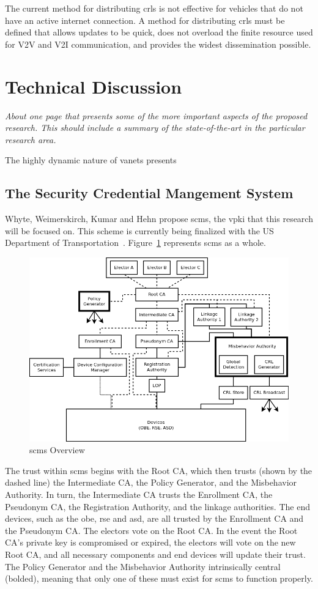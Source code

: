 \documentclass {article}
\newcommand{\sechint}[1]{\small{\emph{#1}} \bigskip}
\begin{document}
The current method for distributing \gls{crl}s is not effective for vehicles that do not have an active internet connection. A method for distributing \gls{crl}s must be defined that allows updates to be quick, does not overload the finite resource used for V2V and V2I communication, and provides the widest dissemination possible.

\section{Technical Discussion}{\sechint{About one page that presents some of the more important aspects of the proposed research. This should include a summary of the state-of-the-art in the particular research area.}}

The highly dynamic nature of \gls{vanet}s presents

\subsection{The Security Credential Mangement System}
Whyte, Weimerskirch, Kumar and Hehn propose \gls{scms}, the \gls{vpki} that this research will be focused on. This scheme is currently being finalized with the US Department of Transportation~\autocite{brecht_security_2018}. Figure~\ref{scms_overview} represents \gls{scms} as a whole. 
\begin{figure}[!ht]
	\centering
	\includegraphics[width=.8\textwidth]{images/scms_diagram.png}
	\caption{\gls{scms} Overview}
	\label{scms_overview}
\end{figure}
The trust within \gls{scms} begins with the Root CA, which then trusts (shown by the dashed line) the Intermediate CA, the Policy Generator, and the Misbehavior Authority. In turn, the Intermediate CA trusts the Enrollment CA, the Pseudonym CA, the Registration Authority, and the linkage authorities. The end devices, such as the \gls{obe}, \gls{rse} and \gls{asd}, are all trusted by the Enrollment CA and the Pseudonym CA. The electors vote on the Root CA. In the event the Root CA's private key is compromised or expired, the electors will vote on the new Root CA, and all necessary components and end devices will update their trust. The Policy Generator and the Misbehavior Authority intrinsically central (bolded), meaning that only one of these must exist for \gls{scms} to function properly.
\end{document}

